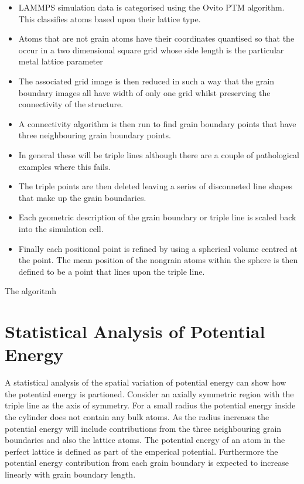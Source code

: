 \documentclass[12pt,a4paper]{book}
\begin{document}
\begin{itemize}

	\item LAMMPS simulation data is categorised using the Ovito PTM algorithm. This classifies atoms based upon their lattice type.
	\item Atoms that are not grain  atoms have their coordinates quantised so that the occur in a two dimensional square grid whose side length is the particular metal lattice parameter
	\item The associated grid image is then reduced in such a way that the grain boundary images all have width of only one grid whilst preserving the connectivity of the structure.
	\item A connectivity algorithm is then run to find grain boundary points that have three neighbouring grain boundary points.
	\item In general these will be triple lines although there are a couple of pathological examples where this fails.
	\item The triple points are then deleted leaving a series of disconneted line shapes that make up the grain boundaries.
	\item Each geometric description of the grain boundary or triple line is scaled back into the simulation cell. 
	\item Finally each positional point is refined by using a spherical volume centred at the point. The mean position of the nongrain atoms within the sphere is then defined to be a point that lines upon the triple line. 

\end{itemize} 

The algoritmh 

\section{Statistical Analysis of Potential Energy}

A statistical analysis of the spatial variation of potential energy can show how the potential energy is partioned. Consider an axially symmetric region with the triple line as the axis of symmetry. For a small radius the potential energy inside the cylinder does not contain any bulk atoms. As the radius increases the potential energy will include contributions from the three neighbouring grain boundaries and also the lattice atoms. The potential energy of an atom in the perfect lattice is defined as part of the emperical potential. Furthermore the potential energy contribution from each grain boundary is expected to increase linearly with grain boundary length. 
\end{document}
